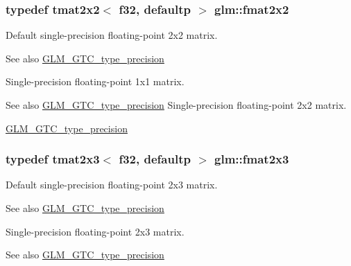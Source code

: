 \subsubsection[{fmat2x2}]{\setlength{\rightskip}{0pt plus 5cm}typedef tmat2x2$<$ f32, defaultp $>$ {\bf glm\+::fmat2x2}}\label{group__gtc__type__precision_ga20fdbcc6b16bed27ad25db9b71d09e93}
Default single-\/precision floating-\/point 2x2 matrix. \begin{DoxySeeAlso}{See also}
\hyperlink{group__gtc__type__precision}{G\+L\+M\+\_\+\+G\+T\+C\+\_\+type\+\_\+precision}
\end{DoxySeeAlso}
Single-\/precision floating-\/point 1x1 matrix. \begin{DoxySeeAlso}{See also}
\hyperlink{group__gtc__type__precision}{G\+L\+M\+\_\+\+G\+T\+C\+\_\+type\+\_\+precision} Single-\/precision floating-\/point 2x2 matrix. 

\hyperlink{group__gtc__type__precision}{G\+L\+M\+\_\+\+G\+T\+C\+\_\+type\+\_\+precision} 
\end{DoxySeeAlso}
\hypertarget{group__gtc__type__precision_ga80f463bcb7e5008c11af5fdbc52c0045}{}
\subsubsection[{fmat2x3}]{\setlength{\rightskip}{0pt plus 5cm}typedef tmat2x3$<$ f32, defaultp $>$ {\bf glm\+::fmat2x3}}\label{group__gtc__type__precision_ga80f463bcb7e5008c11af5fdbc52c0045}
Default single-\/precision floating-\/point 2x3 matrix. \begin{DoxySeeAlso}{See also}
\hyperlink{group__gtc__type__precision}{G\+L\+M\+\_\+\+G\+T\+C\+\_\+type\+\_\+precision}
\end{DoxySeeAlso}
Single-\/precision floating-\/point 2x3 matrix. \begin{DoxySeeAlso}{See also}
\hyperlink{group__gtc__type__precision}{G\+L\+M\+\_\+\+G\+T\+C\+\_\+type\+\_\+precision} 
\end{DoxySeeAlso}
\hypertarget{group__gtc__type__precision_ga76578ee3c2d6de9b46d0efd1c7060b85}{}
